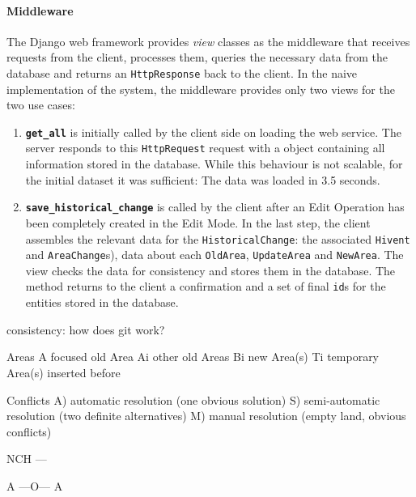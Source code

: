 
\paragraph{Middleware} %
\label{par:middleware}

The Django web framework provides \emph{view} classes as the middleware that receives requests from the client, processes them, queries the necessary data from the database and returns an \texttt{HttpResponse} back to the client. In the naive implementation of the system, the middleware provides only two views for the two use cases:

\begin{enumerate}
  \item \textbf{\texttt{get\_all}} is initially called by the client side on loading the web service. The server responds to this \texttt{HttpRequest} request with a object containing all information stored in the database. While this behaviour is not scalable, for the initial dataset it was sufficient: The data was loaded in 3.5 seconds.
  \item \textbf{\texttt{save\_historical\_change}} is called by the client after an Edit Operation has been completely created in the Edit Mode. In the last step, the client assembles the relevant data for the \texttt{HistoricalChange}: the associated \texttt{Hivent} and \texttt{AreaChange}s), data about each \texttt{OldArea}, \texttt{UpdateArea} and \texttt{NewArea}. The view checks the data for consistency and stores them in the database. The method returns to the client a confirmation and a set of final \texttt{id}s for the entities stored in the database.
\end{enumerate}


consistency: how does git work?

Areas
  A   focused old Area
  Ai  other old Areas
  Bi  new Area(s)
  Ti  temporary Area(s) inserted before

Conflicts
  A)  automatic resolution (one obvious solution)
  S)  semi-automatic resolution (two definite alternatives)
  M)  manual resolution (empty land, obvious conflicts)


NCH
---

A ---O--- A

